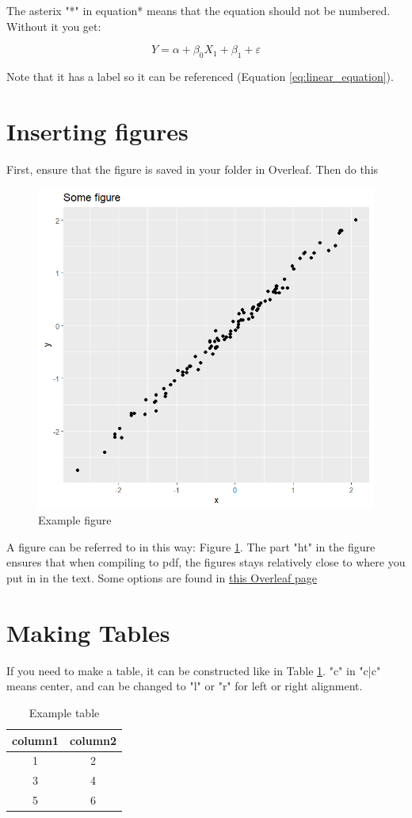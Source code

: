 \documentclass[12pt]{article}
\begin{document}
The asterix "*" in equation* means that the equation should not be numbered. Without it you get:

\begin{equation}\label{eq:linear_equation}
    Y = \alpha + \beta_0X_1+\beta_1+\varepsilon
\end{equation}

Note that it has a label so it can be referenced (Equation \ref{eq:linear_equation}).

\section{Inserting figures}

First, ensure that the figure is saved in your folder in Overleaf. Then do this

\begin{figure}[ht]
    \centering
    \includegraphics[width=0.6\linewidth]{test_figure.png}
    \caption{Example figure}
    \label{fig:example_figure}
\end{figure}

A figure can be referred to in this way: Figure \ref{fig:example_figure}. The part "ht" in the figure ensures that when compiling to pdf, the figures stays relatively close to where you put in in the text. Some options are found in \href{https://www.overleaf.com/learn/latex/Positioning_images_and_tables}{this Overleaf page}

\section{Making Tables}

If you need to make a table, it can be constructed like in Table \ref{tab:example_table}. "c" in "c|c" means center, and can be changed to "l" or "r" for left or right alignment.

\begin{table}[h]
    \centering
    \begin{tabular}{c|c}
    \toprule
       column1  & column2  \\
       \midrule
        1 & 2 \\
        3  & 4 \\
         5  & 6 \\
    \end{tabular}
    \caption{Example table}
    \label{tab:example_table}
\end{table}
\end{document}
